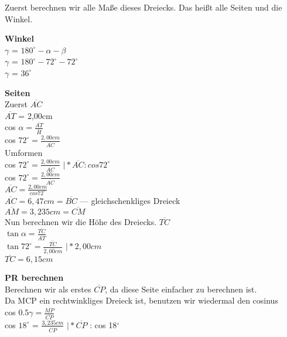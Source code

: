 \documentclass[12pt, a4paper]{article}
\begin{document}
	\begin{flushleft}	
		Zuerst berechnen wir alle Maße dieses Dreiecks. Das heißt alle Seiten und die Winkel.

		\begin{flushleft}
			\textbf{Winkel}
			\\ \(\gamma\) = \(180^\circ -\alpha - \beta\)
			\\ \(\gamma\) = \(180^\circ - 72^\circ - 72^\circ\)
			\\ \(\gamma\) = \(36^\circ\)
		\end{flushleft}		
		
		\begin{flushleft}
			\textbf{Seiten}		
			\\Zuerst \(\overline{AC}\)
			\\ \(\overline{AT}\) = 2,00cm
			\\cos \(\alpha = \frac{\overline{AT}}{\overline{H}}\)
			\\cos \(72^\circ = \frac{2,00cm}{\overline{AC}}\)
			\\Umformen
			\\cos \(72^\circ = \frac{2,00cm}{\overline{AC}}\) \(\vert * \overline{AC} : cos 72^\circ \)
			\smallskip
			\\cos \(72^\circ = \frac{2,00cm}{\overline{AC}}\)
			\smallskip
			\\ \(\overline{AC} = \frac{2,00cm}{cos 72^\circ}\)
			\smallskip
			\\ \(\overline{AC} = 6,47cm = \overline{BC}\)  --- gleichschenkliges Dreieck
			\smallskip
			\\ \(\overline{AM} = 3,235cm = \overline{CM} \)
			\\ Nun berechnen wir die Höhe des Dreiecks. \(\overline{TC}\)
			\\\(\tan \alpha = \frac{\overline{TC}}{\overline{AT}}\)
			\\\(\tan 72^\circ = \frac{\overline{TC}}{\overline{2,00cm}}\)
					\(\vert * 2,00cm\)
			\\\(\overline{TC} = 6,15cm\)			
		\end{flushleft}		
		\begin{flushleft}
			\textbf{PR berechnen}
			\\Berechnen wir als erstes \(\overline{CP}\), da diese Seite einfacher zu berechnen 			  ist.
			\\Da MCP ein rechtwinkliges Dreieck ist, benutzen wir wiedermal den cosinus
			\\cos \(0.5 \gamma = \frac{\overline{MP}}{\overline{CP}}\) 
			\\cos \(18^\circ\) = \(\frac{3,235cm}{\overline{CP}}\) \(\vert * \overline{CP}\) : 					cos 18\(^\circ\)

\end{flushleft}
\end{flushleft}
\end{document}
